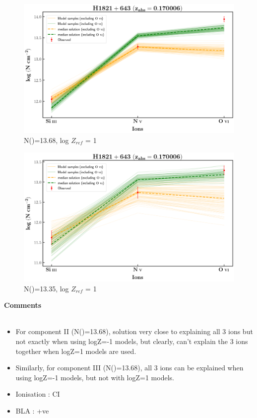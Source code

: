 \documentclass[12pt]{report}
\newcommand\ion[2]{\text{#1\,\textsc{\lowercase{#2}}}}
\begin{document}
\newpage

\begin{figure}[!h]
    \centering
    \includegraphics[width=0.85\linewidth]{Ionisation-Modelling-Plots/h1821-z=0.170006-compII.png}
    \caption{N(\ion{H}{i})=13.68, log $Z_{ref}$ = 1}
\end{figure}

\begin{figure}[!b]
    \centering
    \includegraphics[width=0.85\linewidth]{Ionisation-Modelling-Plots/h1821-z=0.170006-compIII.png}
    \caption{N(\ion{H}{i})=13.35, log $Z_{ref}$ = 1}
\end{figure}


\newpage

\textbf{Comments}
\\\\
\begin{itemize}
    \item For component II (N(\ion{H}{i})=13.68), solution very close to explaining all 3 ions but not exactly when using logZ=-1 models, but clearly, can't explain the 3 ions together when logZ=1 models are used.
    \item Similarly, for component III (N(\ion{H}{i})=13.68), all 3 ions can be explained when using logZ=-1 models, but not with logZ=1 models.
    \item Ionisation : CI
    \item BLA : +ve
\end{itemize}
\end{document}
